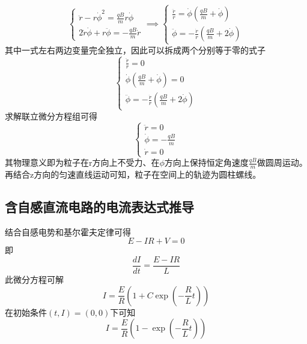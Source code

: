 \begin{equation*}
    \begin{cases}
        \ddot{r}-r\dot{\phi}^2=\frac{qB}{m}r\dot{\phi}\\
        2\dot{r}\dot{\phi}+r\ddot{\phi}=-\frac{qB}{m}\dot{r}
    \end{cases}
    \implies
    \begin{cases}
        \frac{\ddot{r}}{r}=\dot{\phi}\left(\frac{qB}{m}+\dot{\phi}\right)\\
        \ddot{\phi}=-\frac{\dot{r}}{r}\left(\frac{qB}{m}+2\dot{\phi}\right)
    \end{cases}
\end{equation*}
其中一式左右两边变量完全独立，因此可以拆成两个分别等于零的式子
\begin{equation*}
    \begin{cases}
        \frac{\ddot{r}}{r}=0\\
        \dot{\phi}\left(\frac{qB}{m}+\dot{\phi}\right)=0\\
        \ddot{\phi}=-\frac{\dot{r}}{r}\left(\frac{qB}{m}+2\dot{\phi}\right)
    \end{cases}
\end{equation*}
求解联立微分方程组可得
\begin{equation*}
    \begin{cases}
        \ddot{r}=0\\
        \dot{\phi}=-\frac{qB}{m}\\
        \dot{r}=0
    \end{cases}
\end{equation*}
其物理意义即为粒子在r方向上不受力、在$\phi$方向上保持恒定角速度$\frac{qB}{m}$做圆周运动。再结合z方向的匀速直线运动可知，粒子在空间上的轨迹为圆柱螺线。

\subsection{含自感直流电路的电流表达式推导}

结合自感电势和基尔霍夫定律可得
\begin{equation*}
    E-IR+V=0
\end{equation*}
即
\begin{equation*}
    \frac{dI}{dt}=\frac{E-IR}{L}
\end{equation*}
此微分方程可解
\begin{equation*}
    I=\frac{E}{R}\left(1+C\exp\left(-\frac{R}{L}t\right)\right)
\end{equation*}
在初始条件$(t,I)=(0,0)$下可知
\begin{equation*}
    I=\frac{E}{R}\left(1-\exp\left(-\frac{R}{L}t\right)\right)
\end{equation*}

